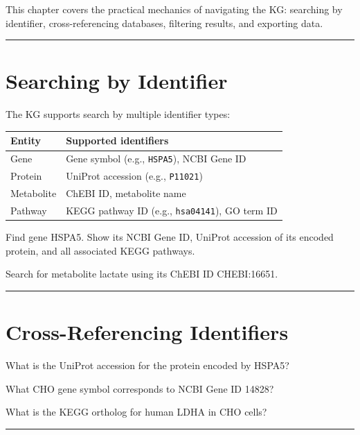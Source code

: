\documentclass[
  letterpaper,
  oneside,
  open=any]{scrbook}
\newcounter{none} %
\begin{document}
This chapter covers the practical mechanics of navigating the KG:
searching by identifier, cross-referencing databases, filtering results,
and exporting data.

\begin{center}\rule{0.5\linewidth}{0.5pt}\end{center}

\section{Searching by Identifier}\label{searching-by-identifier}

The KG supports search by multiple identifier types:

{\def\LTcaptype{none} %
\begin{longtable}[]{@{}ll@{}}
\toprule\noalign{}
Entity & Supported identifiers \\
\midrule\noalign{}
\endhead
\bottomrule\noalign{}
\endlastfoot
Gene & Gene symbol (e.g., \texttt{HSPA5}), NCBI Gene ID \\
Protein & UniProt accession (e.g., \texttt{P11021}) \\
Metabolite & ChEBI ID, metabolite name \\
Pathway & KEGG pathway ID (e.g., \texttt{hsa04141}), GO term ID \\
\end{longtable}
}

Find gene HSPA5. Show its NCBI Gene ID, UniProt accession of its encoded
protein, and all associated KEGG pathways.

Search for metabolite lactate using its ChEBI ID CHEBI:16651.

\begin{center}\rule{0.5\linewidth}{0.5pt}\end{center}

\section{Cross-Referencing
Identifiers}\label{cross-referencing-identifiers}

What is the UniProt accession for the protein encoded by HSPA5?

What CHO gene symbol corresponds to NCBI Gene ID 14828?

What is the KEGG ortholog for human LDHA in CHO cells?

\begin{center}\rule{0.5\linewidth}{0.5pt}\end{center}
\end{document}
